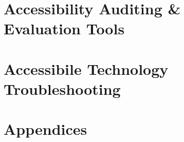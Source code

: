 \documentclass[12pt,letterpaper,twoside]{report}
\begin{document}
\part{Accessibility Auditing \& Evaluation Tools}



\part{Accessibile Technology Troubleshooting}






\part{Appendices}

\end{document}
